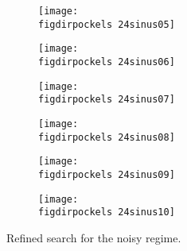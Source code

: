 \begin{figure}
    \begin{subfigure}[b]{\picwidth}
        \texttt{[image: \\figdirpockels 24sinus05]}
        \caption{}
    \end{subfigure}\qquad
    \begin{subfigure}[b]{\picwidth}
        \texttt{[image: \\figdirpockels 24sinus06]}
        \caption{}
    \end{subfigure}
    \begin{subfigure}[b]{\picwidth}
        \texttt{[image: \\figdirpockels 24sinus07]}
        \caption{}
    \end{subfigure}
    \begin{subfigure}[b]{\picwidth}
        \texttt{[image: \\figdirpockels 24sinus08]}
        \caption{}
    \end{subfigure}
    \begin{subfigure}[b]{\picwidth}
        \texttt{[image: \\figdirpockels 24sinus09]}
        \caption{}
    \end{subfigure}
    \begin{subfigure}[b]{\picwidth}
        \texttt{[image: \\figdirpockels 24sinus10]}
        \caption{}
    \end{subfigure}
    \caption{Refined search for the noisy regime.}
    \label{fig:sinus8}
\end{figure}


